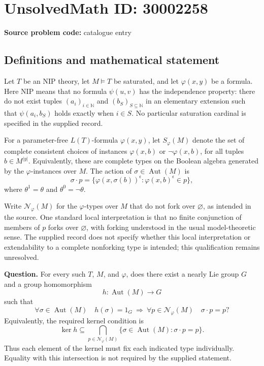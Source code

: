 \documentclass[11pt]{article}
\newcommand{\N}{\mathbb{N}}
\begin{document}
\section*{UnsolvedMath ID: 30002258}
\textbf{Source problem code:} catalogue entry
\subsection{Definitions and mathematical statement}
Let \(T\) be an NIP theory, let \(M\models T\) be saturated, and let \(\varphi(x,y)\) be a formula. Here NIP means that no formula \(\psi(u,v)\) has the independence property: there do not exist tuples \((a_i)_{i\in\N}\) and \((b_S)_{S\subseteq\N}\) in an elementary extension such that \(\psi(a_i,b_S)\) holds exactly when \(i\in S\). No particular saturation cardinal is specified in the supplied record.

For a parameter-free \(L(T)\)-formula \(\varphi(x,y)\), let \(S_\varphi(M)\) denote the set of complete consistent choices of instances \(\varphi(x,b)\) or \(\neg\varphi(x,b)\), for all tuples \(b\in M^{|y|}\). Equivalently, these are complete types on the Boolean algebra generated by the \(\varphi\)-instances over \(M\). The action of \(\sigma\in\operatorname{Aut}(M)\) is
\[
\sigma\cdot p
 =\{\varphi(x,\sigma(b))^{\epsilon}:
       \varphi(x,b)^{\epsilon}\in p\},
\]
where \(\theta^1=\theta\) and \(\theta^0=\neg\theta\).

Write \(\mathcal N_\varphi(M)\) for the \(\varphi\)-types over \(M\) that do not fork over \(\varnothing\), as intended in the source. One standard local interpretation is that no finite conjunction of members of \(p\) forks over \(\varnothing\), with forking understood in the usual model-theoretic sense. The supplied record does not specify whether this local interpretation or extendability to a complete nonforking type is intended; this qualification remains unresolved.

\textbf{Question.} For every such \(T\), \(M\), and \(\varphi\), does there exist a nearly Lie group \(G\) and a group homomorphism
\[
h:\operatorname{Aut}(M)\longrightarrow G
\]
such that
\[
\forall\sigma\in\operatorname{Aut}(M)\quad
h(\sigma)=1_G\ \Longrightarrow\
\forall p\in\mathcal N_\varphi(M)\quad \sigma\cdot p=p?
\]
Equivalently, the required kernel condition is
\[
\ker h\subseteq
\bigcap_{p\in\mathcal N_\varphi(M)}
\{\sigma\in\operatorname{Aut}(M):\sigma\cdot p=p\}.
\]
Thus each element of the kernel must fix each indicated type individually. Equality with this intersection is not required by the supplied statement.
\end{document}
